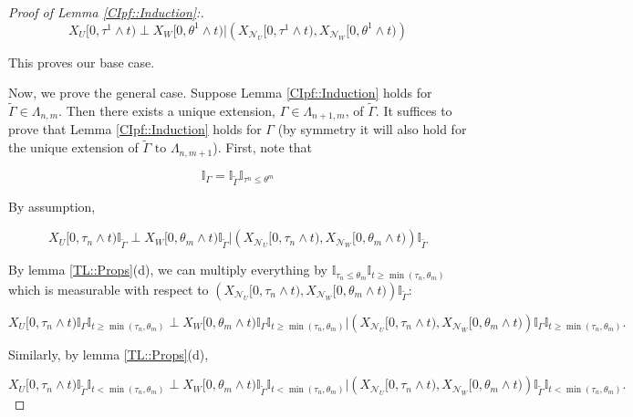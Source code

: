 \documentclass[12pt]{article}
\newcommand{\mb}{\mathbb}
\newcommand{\mc}{\mathcal}
\newcommand{\te}{\text}
\newcommand{\ind}{\hspace{24pt}}
\newcommand{\neigh}[1]{\mc{N}_{#1}}					%
\newcommand{\indx}[1]{^{#1}}						%
\newcommand{\Xf}{X}									%
\newcommand{\vind}[1]{_{#1}}						%
\newcommand{\tmi}[1]{#1}							%
\newcommand{\alt}[1]{\tilde{#1}}					%
\newcommand{\rt}{\tau}								%
\renewcommand{\it}[1]{_{#1}}						%
\newcommand{\seto}{U}								%
\newcommand{\sett}{W}								%
\newcommand{\rtt}{\theta}							%
\newcommand{\apath}{\Gamma}						%
\newcommand{\pathset}[2]{\Lambda_{#1,#2}}		%
\newcommand{\indo}{n}							%
\newcommand{\indt}{m}							%
\begin{document}
\begin{proof}[Proof of Lemma \ref{CIpf::Induction}:]
\[\Xf\vind{\seto}\tmi{[0,\rt\indx{1}\wedge t)}\perp \Xf\vind{\sett}\tmi{[0,\rtt\indx{1}\wedge t)}|\left(\Xf\vind{\neigh{\seto}}\tmi{[0,\rt\indx{1}\wedge t)},\Xf\vind{\neigh{\sett}}\tmi{[0,\rtt\indx{1}\wedge t)}\right)\]

This proves our base case.

\ind Now, we prove the general case. Suppose Lemma \ref{CIpf::Induction} holds for \(\alt{\apath} \in \pathset{\indo}{\indt}\). Then there exists a unique extension, \(\apath \in \pathset{\indo+1}{\indt}\), of \(\alt{\apath}\). It suffices to prove that Lemma \ref{CIpf::Induction} holds for \(\apath\) (by symmetry it will also hold for the unique extension of \(\alt{\apath} \te{ to } \pathset{\indo}{\indt+1}\)). First, note that

\begin{equation}
\mb{I}_{\apath} = \mb{I}_{\alt{\apath}}\mb{I}_{\rt\indx{\indo} \leq \rtt\indx{\indt}}
\label{CIpf::extpath}
\end{equation}

By assumption,

\[\Xf\vind{\seto}\tmi{[0,\rt\it{\indo}\wedge t)}\mb{I}_{\alt{\apath}}\perp \Xf\vind{\sett}\tmi{[0,\rtt\it{\indt}\wedge t)}\mb{I}_{\alt{\apath}}|\left(\Xf\vind{\neigh{\seto}}\tmi{[0,\rt\it{\indo}\wedge t)},\Xf\vind{\neigh{\sett}}\tmi{[0,\rtt\it{\indt}\wedge t)}\right)\mb{I}_{\alt{\apath}}\]

By lemma \ref{TL::Props}(d), we can multiply everything by \(\mb{I}_{\rt\it{\indo} \leq \rtt\it{\indt}}\mb{I}_{t \geq \min(\rt\it{\indo},\rtt\it{\indt})}\) which is measurable with respect to \(\left(\Xf\vind{\neigh{\seto}}\tmi{[0,\rt\it{\indo}\wedge t)},\Xf\vind{\neigh{\sett}}\tmi{[0,\rtt\it{\indt}\wedge t)}\right)\mb{I}_{\alt{\apath}}\):

\begin{equation}
\Xf\vind{\seto}\tmi{[0,\rt\it{\indo}\wedge t)}\mb{I}_{\apath}\mb{I}_{t \geq \min(\rt\it{\indo},\rtt\it{\indt})}\perp \Xf\vind{\sett}\tmi{[0,\rtt\it{\indt}\wedge t)}\mb{I}_{\apath}\mb{I}_{t \geq \min(\rt\it{\indo},\rtt\it{\indt})}|\left(\Xf\vind{\neigh{\seto}}\tmi{[0,\rt\it{\indo}\wedge t)},\Xf\vind{\neigh{\sett}}\tmi{[0,\rtt\it{\indt}\wedge t)}\right)\mb{I}_{\apath}\mb{I}_{t \geq \min(\rt\it{\indo},\rtt\it{\indt})}.
\label{CIpf::bigTind}
\end{equation}

Similarly, by lemma \ref{TL::Props}(d),

\[\Xf\vind{\seto}\tmi{[0,\rt\it{\indo}\wedge t)}\mb{I}_{\alt{\apath}}\mb{I}_{t < \min(\rt\it{\indo},\rtt\it{\indt})}\perp \Xf\vind{\sett}\tmi{[0,\rtt\it{\indt}\wedge t)}\mb{I}_{\alt{\apath}}\mb{I}_{t < \min(\rt\it{\indo},\rtt\it{\indt})}|\left(\Xf\vind{\neigh{\seto}}\tmi{[0,\rt\it{\indo}\wedge t)},\Xf\vind{\neigh{\sett}}\tmi{[0,\rtt\it{\indt}\wedge t)}\right)\mb{I}_{\alt{\apath}}\mb{I}_{t < \min(\rt\it{\indo},\rtt\it{\indt})}.\]


\end{proof}
\end{document}
